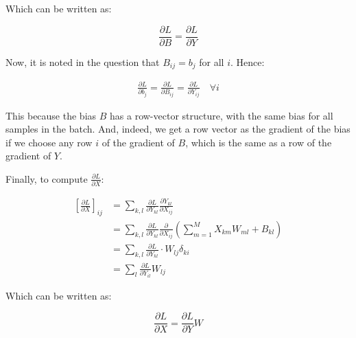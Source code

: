 \documentclass{article}
\begin{document}
Which can be written as:

\begin{equation}
    \frac{\partial L}{\partial B} = \frac{\partial L}{\partial Y}
\end{equation}

Now, it is noted in the question that $B_{ij} = b_j$ for all $i$. Hence:

\begin{align*}
    \frac{\partial L}{\partial b_j} = \frac{\partial L}{\partial B_{ij}} = \frac{\partial L}{\partial Y_{ij}} \quad \forall i
\end{align*}

This because the bias $B$ has a row-vector structure, with the same bias for all samples in the batch. And, indeed,
we get a row vector as the gradient of the bias if we choose any row $i$ of the gradient of $B$, which is the same as
a row of the gradient of $Y$.


Finally, to compute $\frac{\partial L}{\partial X}$:

\begin{align*}
    \left[ \frac{\partial L}{\partial X} \right]_{ij} &= \sum_{k, l} \frac{\partial L}{\partial Y_{kl}} \frac{\partial Y_{kl}}{\partial X_{ij}} \\
    &= \sum_{k, l} \frac{\partial L}{\partial Y_{kl}} \frac{\partial}{\partial X_{ij}} \left( \sum_{m=1}^{M} X_{km} W_{ml} + B_{kl} \right) \\
    &= \sum_{k, l} \frac{\partial L}{\partial Y_{kl}} \cdot W_{lj} \delta_{ki} \\
    &= \sum_{l} \frac{\partial L}{\partial Y_{il}} W_{lj}
\end{align*}


Which can be written as:

\begin{equation}
    \frac{\partial L}{\partial X} = \frac{\partial L}{\partial Y} W
\end{equation}
\end{document}
